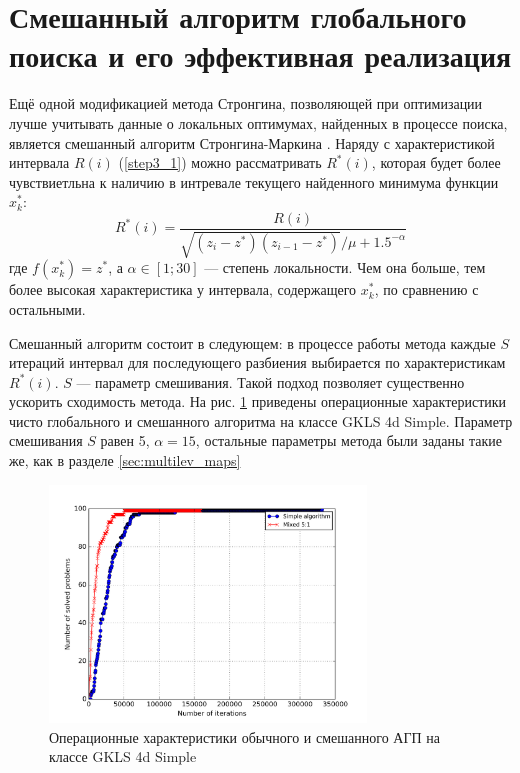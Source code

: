 \section{Смешанный алгоритм глобального поиска и его эффективная реализация}
Ещё одной модификацией метода Стронгина, позволяющей при оптимизации лучше учитывать данные о локальных оптимумах, найденных в процессе поиска, является смешанный алгоритм Стронгина-Маркина \cite{mixedAlg}.
Наряду с характеристикой интервала \(R(i)\) (\ref{step3_1}) можно рассматривать \(R^*(i)\), которая будет более чувствиетльна к наличию в интревале текущего найденного минимума функции \(x_k^*\):
\begin{displaymath}
R^*(i)=\frac{R(i)}{\sqrt{(z_i-z^*)(z_{i-1}-z^*)}/\mu + 1.5^{-\alpha}}
\end{displaymath}
где \(f(x_k^*)=z^*\), а \(\alpha \in [1;30]\) --- степень локальности. Чем она больше, тем более высокая характеристика у интервала, содержащего \(x_k^*\), по сравнению с остальными.
\par
Смешанный алгоритм состоит в следующем: в процессе работы метода каждые \(S\) итераций интервал для последующего разбиения выбирается по характеристикам \(R^*(i)\). \(S\) --- параметр смешивания.
Такой подход позволяет существенно ускорить сходимость метода. На рис. \ref{fig:localMixOP4d} приведены операционные характеристики чисто глобального и смешанного алгоритма на классе GKLS 4d Simple.
Параметр смешивания \(S\) равен 5, \(\alpha=15\), остальные параметры метода были заданы такие же, как в разделе \ref{sec:multilev_maps}
\begin{figure}[ht]
  \center
  \includegraphics[width=0.75\textwidth]{images/mixed_op4d.png}
  \caption{Операционные характеристики обычного и смешанного АГП на классе GKLS 4d Simple}
  \label{fig:localMixOP4d}
\end{figure}
